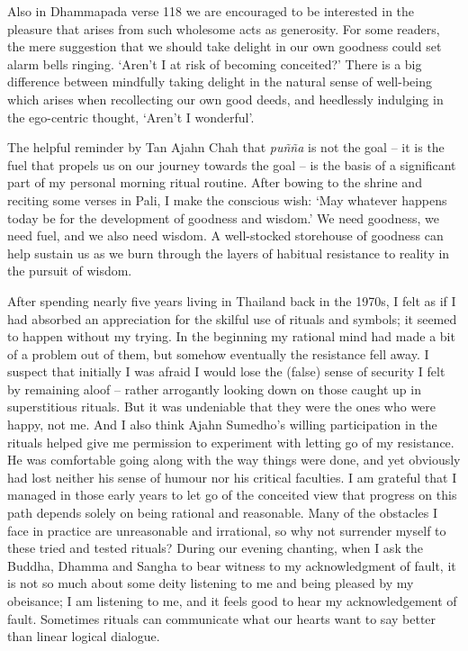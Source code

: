 Also in Dhammapada verse 118 we are encouraged to be interested in the
pleasure that arises from such wholesome acts as generosity. For some
readers, the mere suggestion that we should take delight in our own
goodness could set alarm bells ringing. `Aren't I at risk of becoming
conceited?' There is a big difference between mindfully taking delight
in the natural sense of well-being which arises when recollecting our
own good deeds, and heedlessly indulging in the ego-centric thought,
`Aren't I wonderful'.

The helpful reminder by Tan Ajahn Chah that \emph{puñña} is not the goal
-- it is the fuel that propels us on our journey towards the goal -- is
the basis of a significant part of my personal morning ritual routine.
After bowing to the shrine and reciting some verses in Pali, I make the
conscious wish: `May whatever happens today be for the development of
goodness and wisdom.' We need goodness, we need fuel, and we also need
wisdom. A well-stocked storehouse of goodness can help sustain us as we burn
through the layers of habitual resistance to reality in the pursuit of
wisdom.

After spending nearly five years living in Thailand back in the 1970s, I
felt as if I had absorbed an appreciation for the skilful use of rituals
and symbols; it seemed to happen without my trying. In the beginning my
rational mind had made a bit of a problem out of them, but somehow
eventually the resistance fell away. I suspect that initially I was
afraid I would lose the (false) sense of security I felt by remaining
aloof -- rather arrogantly looking down on those caught up in
superstitious rituals. But it was undeniable that they were the ones who
were happy, not me. And I also think Ajahn Sumedho's willing
participation in the rituals helped give me permission to experiment
with letting go of my resistance. He was comfortable going along with
the way things were done, and yet obviously had lost neither his sense
of humour nor his critical faculties. I am grateful that I managed in
those early years to let go of the conceited view that progress on this
path depends solely on being rational and reasonable. Many of the
obstacles I face in practice are unreasonable and irrational, so why not
surrender myself to these tried and tested rituals? During our evening
chanting, when I ask the Buddha, Dhamma and Sangha to bear witness to my
acknowledgment of fault, it is not so much about some deity listening to me
and being pleased by my obeisance; I am listening to me, and
it feels good to hear my acknowledgement of fault. Sometimes rituals can
communicate what our hearts want to say better than linear logical
dialogue.

